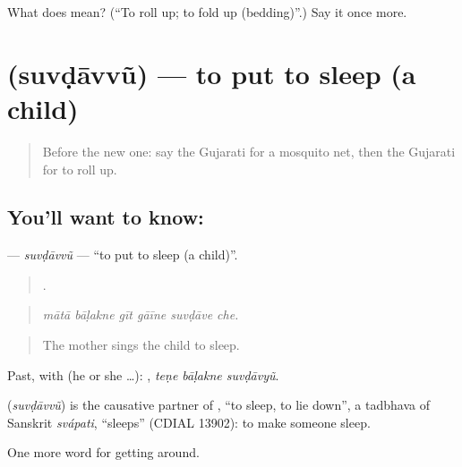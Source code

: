 \begin{tcolorbox}[breakable,colback=teal!4,colframe=teal!35!black,title={Before you move on}]
What does  mean? (\textquotedblleft{}To roll up; to fold up (bedding)\textquotedblright{}.) Say it once more.
\end{tcolorbox}
\section[\texorpdfstring{\gu{સુવડાવવું} (suvḍāvvũ)}{સુવડાવવું (suvḍāvvũ)}]{ (suvḍāvvũ) — to put to sleep (a child)}

\label{lesson:GU-C411-suvdavvu}



\begin{quote}
Before the new one: say the Gujarati for a mosquito net, then the Gujarati for to roll up.
\end{quote}

\subsection*{You'll want to know: }
\textbf{} — \emph{suvḍāvvũ} — \textquotedblleft{}to put to sleep (a child)\textquotedblright{}.

\begin{quote}
     .
\end{quote}

\begin{quote}
\emph{mātā bāḷakne gīt gāīne suvḍāve che.}
\end{quote}

\begin{quote}
The mother sings the child to sleep.
\end{quote}

Past, with  (he or she …):   , \emph{teṇe bāḷakne suvḍāvyũ}.

\begin{cousinweb}
\textbf{} (\emph{suvḍāvvũ}) is the causative partner of , \textquotedblleft{}to sleep, to lie down\textquotedblright{}, a tadbhava of Sanskrit \emph{svápati}, \textquotedblleft{}sleeps\textquotedblright{} (CDIAL 13902): to make someone sleep.
\end{cousinweb}

\begin{grammarlens}[title={What you've built}]
One more word for getting around.
\end{grammarlens}

